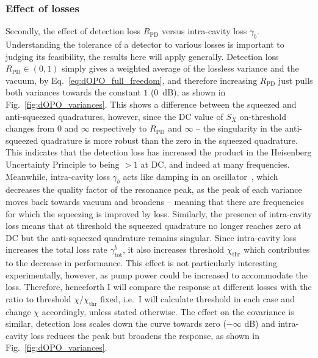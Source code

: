 \subsubsection{Effect of losses}

Secondly, the effect of detection loss $R_\text{PD}$ versus intra-cavity loss $\gamma_b$. Understanding the tolerance of a detector to various losses is important to judging its feasibility, the results here will apply generally. Detection loss $R_\text{PD}\in(0,1)$ simply gives a weighted average of the lossless variance and the vacuum, by Eq.~\ref{eq:dOPO_full_freedom}, and therefore increasing $R_\text{PD}$ just pulls both variances towards the constant $1$ ($0$~dB), as shown in Fig.~\ref{fig:dOPO_variances}. This shows a difference between the squeezed and anti-squeezed quadratures, however, since the DC value of $S_X$ on-threshold changes from $0$ and $\infty$ respectively to $R_\text{PD}$ and $\infty$ -- the singularity in the anti-squeezed quadrature is more robust than the zero in the squeezed quadrature. This indicates that the detection loss has increased the product in the Heisenberg Uncertainty Principle to being $>1$ at DC, and indeed at many  frequencies. Meanwhile, intra-cavity loss $\gamma_b$ acts like damping in an oscillator~\cite{}, which decreases the quality factor of the resonance peak, as the peak of each variance moves back towards vacuum and broadens -- meaning that there are frequencies for which the squeezing is improved by loss. Similarly, the presence of intra-cavity loss means that at threshold the squeezed quadrature no longer reaches zero at DC but the anti-squeezed quadrature remains singular. Since intra-cavity loss increases the total loss rate $\gamma^b_\text{tot}$, it also increases threshold $\chi_\text{thr}$ which contributes to the decrease in performance. This effect is not particularly interesting experimentally, however, as pump power could be increased to accommodate the loss. Therefore, henceforth I will compare the response at different losses with the ratio to threshold $\chi/\chi_\text{thr}$ fixed, i.e.\ I will calculate threshold in each case and change $\chi$ accordingly, unless stated otherwise. 
The effect on the covariance is similar, detection loss scales down the curve towards zero ($-\infty$ dB) and intra-cavity loss reduces the peak but broadens the response, as shown in Fig.~\ref{fig:dOPO_variances}.

